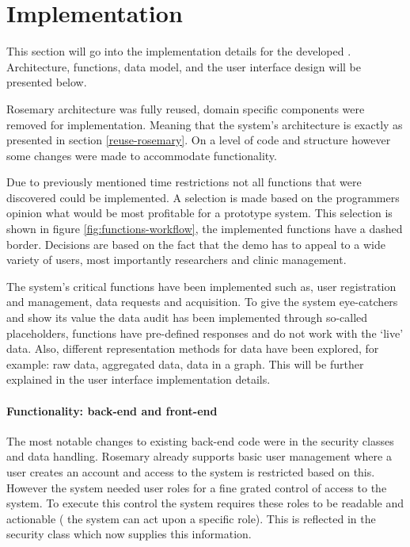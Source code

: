 \section{Implementation \ivfsystem{}}


This section will go into the implementation details for the developed \ivfsystem{}.
Architecture, functions, data model, and the user interface design will be presented below.

Rosemary architecture was fully reused, domain specific components were removed for \ivfsystem{} implementation.
Meaning that the system's architecture is exactly as presented in section \ref{reuse-rosemary}.
On a level of code and structure however some changes were made to accommodate \ivfsystem{} functionality.

Due to previously mentioned time restrictions not all functions that were discovered could be implemented.
A selection is made based on the programmers opinion what would be most profitable for a prototype system.
This selection is shown in figure \ref{fig:functions-workflow}, the implemented functions have a dashed border.
Decisions are based on the fact that the demo has to appeal to a wide variety of users, most importantly researchers and clinic management.

The system's critical functions have been implemented such as, user registration and management, data requests and acquisition.
To give the system eye-catchers and show its value the data audit has been implemented through so-called placeholders, \ie{} functions have pre-defined responses and do not work with the `live' data.
Also, different representation methods for data have been explored, for example: raw data, aggregated data, data in a graph.
This will be further explained in the user interface implementation details.

\paragraph{Functionality: back-end and front-end}
The most notable changes to existing back-end code were in the security classes and data handling.
Rosemary already supports basic user management where a user creates an account and access to the system is restricted based on this.
However the system needed user roles for a fine grated control of access to the system.
To execute this control the system requires these roles to be readable and actionable (\ie{} the system can act upon a specific role).
This is reflected in the security class which now supplies this information.

